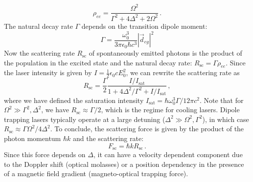 \documentclass[../Thesis-IJspeert.tex]{subfiles}
\begin{document}
\begin{equation}
\label{rhoee}
{\rho}_{ee}=\frac{\Omega^2}{\Gamma^2+4\Delta^2+2\Omega^2}\,.
\end{equation}
The natural decay rate $\Gamma$ depends on the transition dipole moment:
\begin{equation}
\Gamma=\frac{\omega_0^3}{3\pi\epsilon_0\hbar c^3}|\vec{d}_{eg}|^2
\end{equation}
Now the scattering rate $R_\text{sc}$ of spontaneously emitted photons is the product of the population in the excited state and the natural decay rate: $R_\text{sc}=\Gamma \rho_{ee}$. Since the laser intensity is given by $I=\frac{1}{2}\epsilon_0 c E_0^2$, we can rewrite the scattering rate as
\begin{equation}
\label{scatter}
R_\text{sc}=\frac{\Gamma}{2}\frac{{I}/{I_\text{sat}}}{1+{4\Delta^2}/{\Gamma^2}+{I}/{I_\text{sat}}}\,,
\end{equation}
where we have defined the saturation intensity $I_\text{sat}=\hbar \omega_0^3\Gamma/12\pi c^2$. Note that for $\Omega^2\gg\Gamma^2,\Delta^2$, we have $R_\text{sc}\approx\Gamma/2$, which is the regime for cooling lasers. Dipole trapping lasers typically operate at a large detuning ($\Delta^2\gg\Omega^2,\Gamma^2$), in which case $R_\text{sc}\approx\Gamma\Omega^2/4\Delta^2$. To conclude, the scattering force is given by the product of the photon momentum $\hbar k$ and the scattering rate:
\begin{equation}
F_\text{sc}=\hbar kR_\text{sc}\,.
\end{equation}
Since this force depends on $\Delta$, it can have a velocity dependent component due to the Doppler shift (optical molasses) or a position dependency in the presence of a magnetic field gradient (magneto-optical trapping force).
\end{document}
